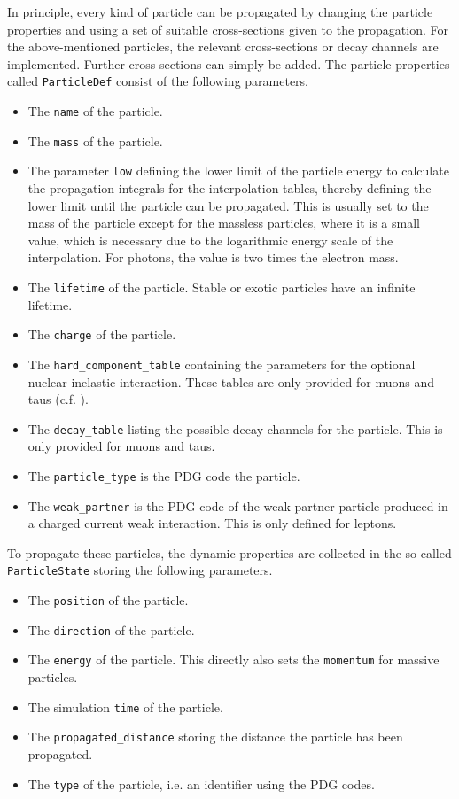 In principle, every kind of particle can be propagated by changing the particle properties and using a set of suitable cross-sections given to the propagation.
For the above-mentioned particles, the relevant cross-sections or decay channels are implemented.
Further cross-sections can simply be added.
The particle properties called \texttt{ParticleDef} consist of the following parameters.
\begin{itemize}
    \item The \texttt{name} of the particle.
    \item The \texttt{mass} of the particle.
    \item The parameter \texttt{low} defining the lower limit of the particle energy to calculate the propagation integrals for the interpolation tables, thereby defining the lower limit until the particle can be propagated.
    This is usually set to the mass of the particle except for the massless particles, where it is a small value, which is necessary due to the logarithmic energy scale of the interpolation.
    For photons, the value is two times the electron mass.
    \item The \texttt{lifetime} of the particle. Stable or exotic particles have an infinite lifetime.
    \item The \texttt{charge} of the particle.
    \item The \texttt{hard\_component\_table} containing the parameters for the optional nuclear inelastic interaction. These tables are only provided for muons and taus (c.f. ).
    \item The \texttt{decay\_table} listing the possible decay channels for the particle. This is only provided for muons and taus.
    \item The \texttt{particle\_type} is the PDG code the particle.
    \item The \texttt{weak\_partner} is the PDG code of the weak partner particle produced in a charged current weak interaction. This is only defined for leptons.
\end{itemize}
To propagate these particles, the dynamic properties are collected in the so-called \texttt{ParticleState} storing the following parameters.
\begin{itemize}
    \item The \texttt{position} of the particle.
    \item The \texttt{direction} of the particle.
    \item The \texttt{energy} of the particle. This directly also sets the \texttt{momentum} for massive particles.
    \item The simulation \texttt{time} of the particle.
    \item The \texttt{propagated\_distance} storing the distance the particle has been propagated.
    \item The \texttt{type} of the particle, i.e. an identifier using the PDG codes.
\end{itemize}
